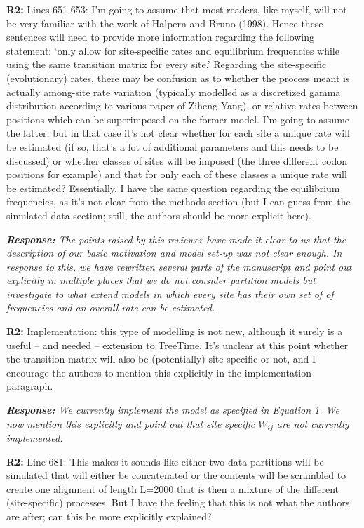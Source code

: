 \documentclass[aps,rmp,onecolumn]{revtex4-1}
\newcommand{\refb}[1]{\textbf{R2:} #1}
\newcommand{\response}[1]{{\it {\color{response}\textbf{Response:} #1}}}
\begin{document}
\refb{Lines 651-653: I’m going to assume that most readers, like myself, will not be very familiar with the work of Halpern and Bruno (1998). Hence these sentences will need to provide more information regarding the following statement: ‘only allow for site-specific rates and equilibrium frequencies while using the same transition matrix for every site.’ Regarding the site-specific (evolutionary) rates, there may be confusion as to whether the process meant is actually among-site rate variation (typically modelled as a discretized gamma distribution according to various paper of Ziheng Yang), or relative rates between positions which can be superimposed on the former model. I’m going to assume the latter, but in that case it’s not clear whether for each site a unique rate will be estimated (if so, that’s a lot of additional parameters and this needs to be discussed) or whether classes of sites will be imposed (the three different codon positions for example) and that for only each of these classes a unique rate will be estimated? Essentially, I have the same question regarding the equilibrium frequencies, as it’s not clear from the methods section (but I can guess from the simulated data section; still, the authors should be more explicit here).}

\response{
The points raised by this reviewer have made it clear to us that the description of our basic motivation and model set-up was not clear enough. In response to this, we have rewritten several parts of the manuscript and point out explicitly in multiple places that we do not consider partition models but investigate to what extend models in which every site has their own set of of frequencies and an overall rate can be estimated. }


\refb{Implementation: this type of modelling is not new, although it surely is a useful -- and needed -- extension to TreeTime. It’s unclear at this point whether the transition matrix will also be (potentially) site-specific or not, and I encourage the authors to mention this explicitly in the implementation paragraph.}

\response{We currently implement the model as specified in Equation 1. We now mention this explicitly and point out that site specific $W_{ij}$ are not currently implemented.}


\refb{Line 681: This makes it sounds like either two data partitions will be simulated that will either be concatenated or the contents will be scrambled to create one alignment of length L=2000 that is then a mixture of the different (site-specific) processes. But I have the feeling that this is not what the authors are after; can this be more explicitly explained?}
\end{document}

